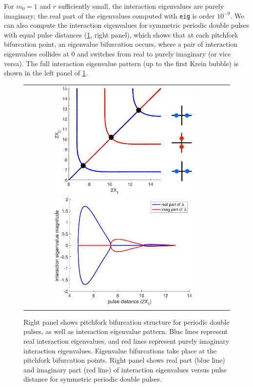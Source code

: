 \documentclass[10pt,reqno]{amsart}
\theoremstyle{plain}
\theoremstyle{definition}
\theoremstyle{remark}
\numberwithin{theorem}{section}
\numberwithin{equation}{section}
\begin{document}
For $m_0 = 1$ and $r$ sufficiently small, the interaction eigenvalues are purely imaginary; the real part of the eigenvalues computed with \texttt{eig} is order $10^{-9}$. We can also compute the interaction eigenvalues for symmetric periodic double pulses with equal pulse distances (\cref{fig:periodiceigbif}, right panel), which shows that at each pitchfork bifurcation point, an eigenvalue bifurcation occurs, where a pair of interaction eigenvalues collides at 0 and switches from real to purely imaginary (or vice versa). The full interaction eigenvalue pattern (up to the first Krein bubble) is shown in the left panel of \cref{fig:periodiceigbif}.
\begin{figure}[H]
\begin{center}
\begin{tabular}{cc}
\includegraphics[width=7.5cm]{images/2periodiceigpattern.eps}
\includegraphics[width=7.5cm]{images/periodicequaleigbif.eps}
\end{tabular}
\end{center}
\caption{Right panel shows pitchfork bifurcation structure for periodic double pulses, as well as interaction eigenvalue pattern. Blue lines represent real interaction eigenvalues, and red lines represent purely imaginary interaction eigenvalues. Eigenvalue bifurcations take place at the pitchfork bifurcation points. Right panel shows real part (blue line) and imaginary part (red line) of interaction eigenvalues versus pulse distance for symmetric periodic double pulses. }
\label{fig:periodiceigbif}
\end{figure}
\end{document}
